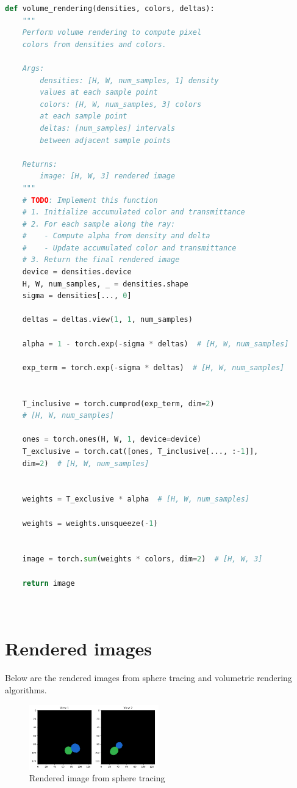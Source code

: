 \documentclass[12pt]{article}
\begin{document}
\begin{lstlisting}[language=python]
def volume_rendering(densities, colors, deltas):
    """
    Perform volume rendering to compute pixel 
    colors from densities and colors.

    Args:
        densities: [H, W, num_samples, 1] density 
        values at each sample point
        colors: [H, W, num_samples, 3] colors 
        at each sample point
        deltas: [num_samples] intervals 
        between adjacent sample points

    Returns:
        image: [H, W, 3] rendered image
    """
    # TODO: Implement this function
    # 1. Initialize accumulated color and transmittance
    # 2. For each sample along the ray:
    #    - Compute alpha from density and delta
    #    - Update accumulated color and transmittance
    # 3. Return the final rendered image
    device = densities.device
    H, W, num_samples, _ = densities.shape
    sigma = densities[..., 0]

    deltas = deltas.view(1, 1, num_samples)

    alpha = 1 - torch.exp(-sigma * deltas)  # [H, W, num_samples]

    exp_term = torch.exp(-sigma * deltas)  # [H, W, num_samples]

    
    T_inclusive = torch.cumprod(exp_term, dim=2)  
    # [H, W, num_samples]
   
    ones = torch.ones(H, W, 1, device=device)
    T_exclusive = torch.cat([ones, T_inclusive[..., :-1]], 
    dim=2)  # [H, W, num_samples]

   
    weights = T_exclusive * alpha  # [H, W, num_samples]

    weights = weights.unsqueeze(-1)

    
    image = torch.sum(weights * colors, dim=2)  # [H, W, 3]

    return image

    
\end{lstlisting}

\section{Rendered images}
Below are the rendered images from sphere tracing and volumetric rendering algorithms.
\begin{figure}[H]
\centering
\includegraphics[width=0.5\textwidth]{sphere_tracing.png}
\caption{Rendered image from sphere tracing}
\end{figure}
\end{document}
